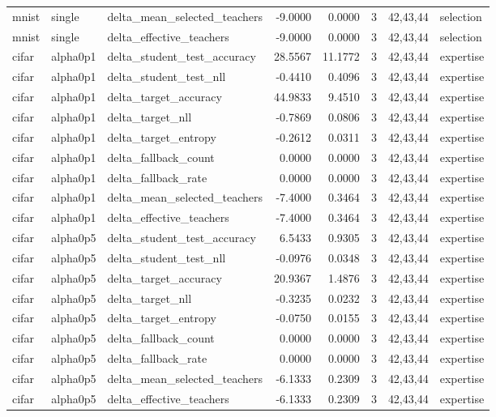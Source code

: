 \begin{tabular}{lllrrrll}
mnist & single & delta\_mean\_selected\_teachers & -9.0000 & 0.0000 & 3 & 42,43,44 & selection \\
mnist & single & delta\_effective\_teachers & -9.0000 & 0.0000 & 3 & 42,43,44 & selection \\
cifar & alpha0p1 & delta\_student\_test\_accuracy & 28.5567 & 11.1772 & 3 & 42,43,44 & expertise \\
cifar & alpha0p1 & delta\_student\_test\_nll & -0.4410 & 0.4096 & 3 & 42,43,44 & expertise \\
cifar & alpha0p1 & delta\_target\_accuracy & 44.9833 & 9.4510 & 3 & 42,43,44 & expertise \\
cifar & alpha0p1 & delta\_target\_nll & -0.7869 & 0.0806 & 3 & 42,43,44 & expertise \\
cifar & alpha0p1 & delta\_target\_entropy & -0.2612 & 0.0311 & 3 & 42,43,44 & expertise \\
cifar & alpha0p1 & delta\_fallback\_count & 0.0000 & 0.0000 & 3 & 42,43,44 & expertise \\
cifar & alpha0p1 & delta\_fallback\_rate & 0.0000 & 0.0000 & 3 & 42,43,44 & expertise \\
cifar & alpha0p1 & delta\_mean\_selected\_teachers & -7.4000 & 0.3464 & 3 & 42,43,44 & expertise \\
cifar & alpha0p1 & delta\_effective\_teachers & -7.4000 & 0.3464 & 3 & 42,43,44 & expertise \\
cifar & alpha0p5 & delta\_student\_test\_accuracy & 6.5433 & 0.9305 & 3 & 42,43,44 & expertise \\
cifar & alpha0p5 & delta\_student\_test\_nll & -0.0976 & 0.0348 & 3 & 42,43,44 & expertise \\
cifar & alpha0p5 & delta\_target\_accuracy & 20.9367 & 1.4876 & 3 & 42,43,44 & expertise \\
cifar & alpha0p5 & delta\_target\_nll & -0.3235 & 0.0232 & 3 & 42,43,44 & expertise \\
cifar & alpha0p5 & delta\_target\_entropy & -0.0750 & 0.0155 & 3 & 42,43,44 & expertise \\
cifar & alpha0p5 & delta\_fallback\_count & 0.0000 & 0.0000 & 3 & 42,43,44 & expertise \\
cifar & alpha0p5 & delta\_fallback\_rate & 0.0000 & 0.0000 & 3 & 42,43,44 & expertise \\
cifar & alpha0p5 & delta\_mean\_selected\_teachers & -6.1333 & 0.2309 & 3 & 42,43,44 & expertise \\
cifar & alpha0p5 & delta\_effective\_teachers & -6.1333 & 0.2309 & 3 & 42,43,44 & expertise \\

\end{tabular}
